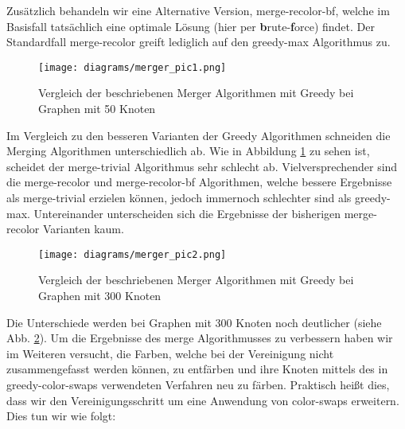\documentclass[11pt]{article}
\begin{document}
Zusätzlich behandeln wir eine Alternative Version, merge-recolor-bf, welche im Basisfall tatsächlich eine optimale Lösung (hier per \textbf{b}rute-\textbf{f}orce) findet.
Der Standardfall merge-recolor greift lediglich auf den greedy-max Algorithmus zu.

\begin{figure}
  \texttt{[image: diagrams/merger\_pic1.png]}
  \caption{Vergleich der beschriebenen Merger Algorithmen mit Greedy bei Graphen mit 50 Knoten}
  \label{fig:merge1}
\end{figure}

Im Vergleich zu den besseren Varianten der Greedy Algorithmen schneiden die Merging Algorithmen unterschiedlich ab. Wie in Abbildung \ref{fig:merge1} zu sehen ist, scheidet der merge-trivial Algorithmus sehr schlecht ab.
Vielversprechender sind die merge-recolor und merge-recolor-bf Algorithmen, welche bessere Ergebnisse als merge-trivial erzielen können, jedoch immernoch schlechter sind als greedy-max. Untereinander unterscheiden sich die Ergebnisse der bisherigen merge-recolor Varianten kaum.

\begin{figure}
  \texttt{[image: diagrams/merger\_pic2.png]}
  \caption{Vergleich der beschriebenen Merger Algorithmen mit Greedy bei Graphen mit 300 Knoten}
  \label{fig:merge2}
\end{figure}

Die Unterschiede werden bei Graphen mit 300 Knoten noch deutlicher (siehe Abb. \ref{fig:merge2}).
Um die Ergebnisse des merge Algorithmusses zu verbessern haben wir im Weiteren versucht, 
die Farben, welche bei der Vereinigung nicht zusammengefasst werden können,
zu entfärben und ihre Knoten mittels des in greedy-color-swaps verwendeten Verfahren neu zu färben.
Praktisch heißt dies, dass wir den Vereinigungsschritt um eine Anwendung von color-swaps erweitern.
Dies tun wir wie folgt:
\end{document}
